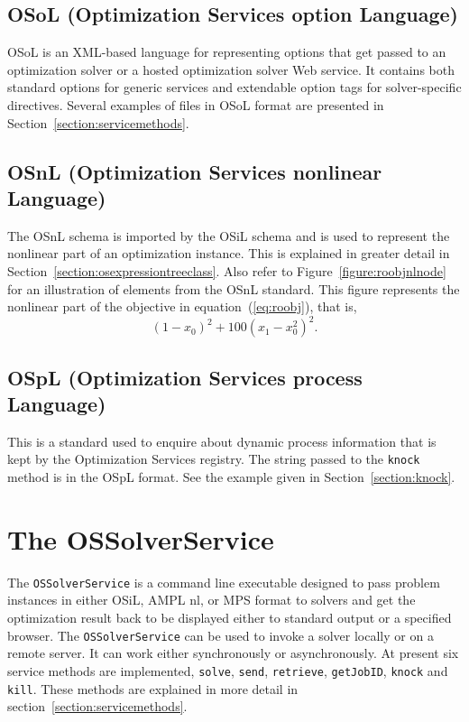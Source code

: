 \documentclass[11pt]{article}
\newcounter{Fig}
\renewcommand{\_}{{\char"5F}}
\renewcommand{\{}{{\char"7B}}
\renewcommand{\}}{{\char"7D}}
\renewcommand{\^}{{\char"0D}}
\renewcommand{\'}{{\char"0D}}
\begin{document}
\begin{enumerate}[Step 1:]
\subsection{OSoL (Optimization Services option Language)} \label{section:osolschema}
OSoL is
an XML-based language for representing options that get passed to an optimization solver or a hosted optimization
solver Web service. It contains both standard options for generic services and extendable option tags for
solver-specific directives.
Several examples of files in OSoL format are presented in Section~\ref{section:servicemethods}.%

\subsection{OSnL (Optimization Services nonlinear Language)} \label{section:osnlschema}
The OSnL schema is imported by the OSiL schema and is used 
to represent the nonlinear part of an optimization instance. 
This is explained in greater detail in Section~\ref{section:osexpressiontreeclass}. Also refer to
Figure~\ref{figure:roobjnlnode} for an illustration of elements from the OSnL standard. This figure represents
the nonlinear part of the objective in equation~(\ref{eq:roobj}), that is,
%
$$
(1-x_0)^2 + 100 (x_1-x_0^2)^2.
$$

\subsection{OSpL (Optimization Services process Language)} \label{section:osplschema}
This is a standard used to enquire about dynamic process information that 
is kept by the Optimization Services registry. The string passed to the {\tt knock} 
method is in the OSpL format. See the example given in Section~\ref{section:knock}.


\section{The OSSolverService}\label{section:ossolverservice}

The {\tt OSSolverService} is a command line executable designed
to pass problem instances in either  OSiL, AMPL nl, or MPS format
to solvers and get the optimization result back to be displayed either to standard output or a specified browser.
The {\tt OSSolverService} can be used to invoke a solver locally or on a remote server. It can work either synchronously
or asynchronously. At present six service methods are implemented, {\tt solve},
{\tt send}, {\tt retrieve},
{\tt getJobID}, {\tt knock} and {\tt kill}.
These methods are explained in more detail in section~\ref{section:servicemethods}.


\end{enumerate}
\end{document}
